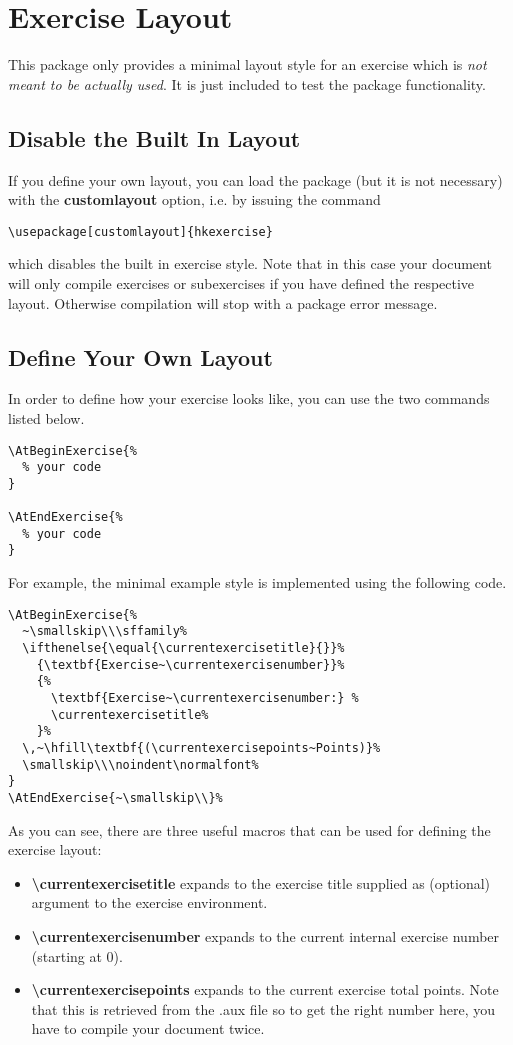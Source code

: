 \documentclass[
  twocolumn,%
  fontsize=9pt,%
  DIV=calc,%
  numbers=noendperiod%
]{scrartcl}
\begin{document}
\section{Exercise Layout}
This package only provides a minimal layout style for an exercise which is \emph{not meant to be actually used}. It is just included to test the package functionality.

\subsection{Disable the Built In Layout}
If you define your own layout, you can load the package (but it is not necessary) with the \textcolor{NavyBlue}{\ttfamily\bfseries customlayout} option, i.e. by issuing the command 
\begin{lstlisting}
\usepackage[customlayout]{hkexercise}
\end{lstlisting}
which disables the built in exercise style. Note that in this case your document will only compile exercises or subexercises if you have defined the respective layout. Otherwise compilation will stop with a package error message.

\subsection{Define Your Own Layout}
In order to define how your exercise looks like, you can use the two commands listed below.
\begin{lstlisting}
\AtBeginExercise{%
  % your code
}

\AtEndExercise{%
  % your code
}
\end{lstlisting}
For example, the minimal example style is implemented using the following code.
\begin{lstlisting}
\AtBeginExercise{%
  ~\smallskip\\\sffamily%
  \ifthenelse{\equal{\currentexercisetitle}{}}%
    {\textbf{Exercise~\currentexercisenumber}}%
    {%
      \textbf{Exercise~\currentexercisenumber:} %
      \currentexercisetitle%
    }%
  \,~\hfill\textbf{(\currentexercisepoints~Points)}%
  \smallskip\\\noindent\normalfont%
}
\AtEndExercise{~\smallskip\\}%
\end{lstlisting}
As you can see, there are three useful macros that can be used for defining the exercise layout:
\begin{itemize}
  \item \textcolor{NavyBlue}{\ttfamily\bfseries\textbackslash currentexercisetitle} expands to the exercise title supplied as (optional) argument to the exercise environment.
  \item \textcolor{NavyBlue}{\ttfamily\bfseries\textbackslash currentexercisenumber} expands to the current internal exercise number (starting at $0$). 
  \item \textcolor{NavyBlue}{\ttfamily\bfseries\textbackslash currentexercisepoints} expands to the current exercise total points. Note that this is retrieved from the .aux file so to get the right number here, you have to compile your document twice.
\end{itemize}
\end{document}
